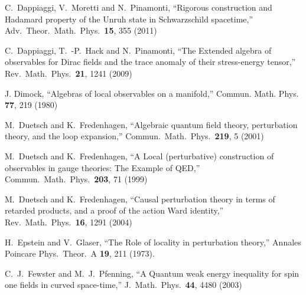 \documentclass[12pt]{article}
\theoremstyle{plain}
\theoremstyle{definition}
\begin{document}
\begin{thebibliography}{99}
  C.~Dappiaggi, V.~Moretti and N.~Pinamonti,
  ``Rigorous construction and Hadamard property of the Unruh state in Schwarzschild spacetime,''
  Adv.\ Theor.\ Math.\ Phys.\  {\bf 15}, 355 (2011)


C.~Dappiaggi, T.~-P.~Hack and N.~Pinamonti,
  ``The Extended algebra of observables for Dirac fields and the trace anomaly of their stress-energy tensor,''
  Rev.\ Math.\ Phys.\  {\bf 21}, 1241 (2009)





J. Dimock, ``Algebras of local observables on a manifold,''
Commun. Math. Phys. {\bf 77}, 219 (1980)

M.~Duetsch and K.~Fredenhagen,
  ``Algebraic quantum field theory, perturbation theory, and the loop expansion,''
  Commun.\ Math.\ Phys.\  {\bf 219}, 5 (2001)


 M.~Duetsch and K.~Fredenhagen,
  ``A Local (perturbative) construction of observables in gauge theories: The Example of QED,''
  Commun.\ Math.\ Phys.\  {\bf 203}, 71 (1999)


M.~Duetsch and K.~Fredenhagen,
  ``Causal perturbation theory in terms of retarded products, and a proof of the action Ward identity,''
  Rev.\ Math.\ Phys.\  {\bf 16}, 1291 (2004)


 H.~Epstein and V.~Glaser,
  ``The Role of locality in perturbation theory,''
  Annales Poincare Phys.\ Theor.\ A {\bf 19}, 211 (1973).


C.~J.~Fewster and M.~J.~Pfenning,
  ``A Quantum weak energy inequality for spin one fields in curved space-time,''
  J.\ Math.\ Phys.\  {\bf 44}, 4480 (2003)



\end{thebibliography}
\end{document}

